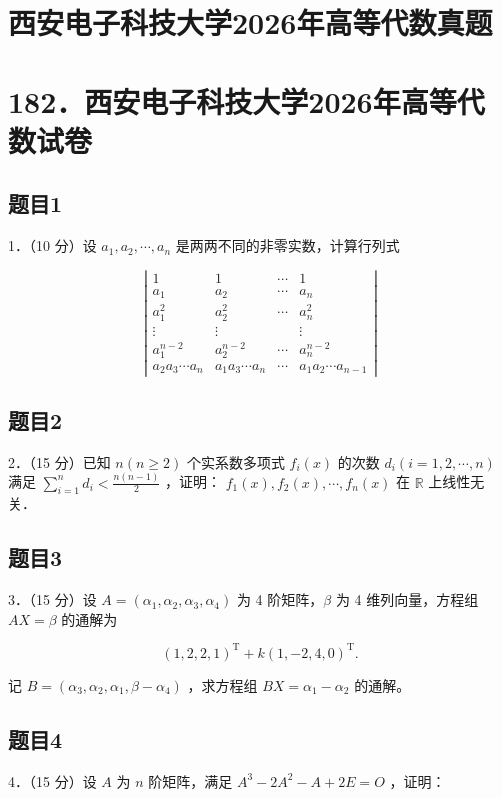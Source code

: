 \documentclass{article}
\begin{document}
\section*{西安电子科技大学2026年高等代数真题}
\section*{182．西安电子科技大学2026年高等代数试卷}

\subsection{题目1}
1．（10 分）设 \(a_{1}, a_{2}, \cdots, a_{n}\) 是两两不同的非零实数，计算行列式

\[
\left|\begin{array}{cccc}
1 & 1 & \cdots & 1 \\
a_{1} & a_{2} & \cdots & a_{n} \\
a_{1}^{2} & a_{2}^{2} & \cdots & a_{n}^{2} \\
\vdots & \vdots & & \vdots \\
a_{1}^{n-2} & a_{2}^{n-2} & \cdots & a_{n}^{n-2} \\
a_{2} a_{3} \cdots a_{n} & a_{1} a_{3} \cdots a_{n} & \cdots & a_{1} a_{2} \cdots a_{n-1}
\end{array}\right|
\]

\subsection{题目2}
2．（15 分）已知 \(n(n \geq 2)\) 个实系数多项式 \(f_{i}(x)\) 的次数 \(d_{i}(i=1,2, \cdots, n)\) 满足 \(\sum_{i=1}^{n} d_{i}<\frac{n(n-1)}{2}\) ，证明： \(f_{1}(x), f_{2}(x), \cdots, f_{n}(x)\) 在 \(\mathbb{R}\) 上线性无关．

\subsection{题目3}
3．（15 分）设 \(A=\left(\alpha_{1}, \alpha_{2}, \alpha_{3}, \alpha_{4}\right)\) 为 4 阶矩阵，\(\beta\) 为 4 维列向量，方程组 \(A X=\beta\) 的通解为

\[
(1,2,2,1)^{\mathrm{T}}+k(1,-2,4,0)^{\mathrm{T}} .
\]

记 \(B=\left(\alpha_{3}, \alpha_{2}, \alpha_{1}, \beta-\alpha_{4}\right)\) ，求方程组 \(B X=\alpha_{1}-\alpha_{2}\) 的通解。

\subsection{题目4}
4．（15 分）设 \(A\) 为 \(n\) 阶矩阵，满足 \(A^{3}-2 A^{2}-A+2 E=O\) ，证明：
\end{document}
